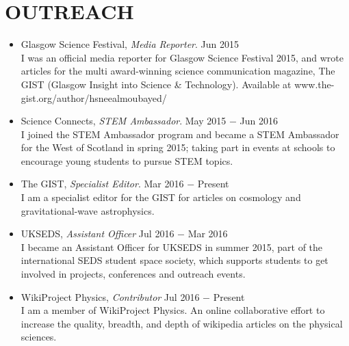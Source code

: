 
\section{\textbf{\color{RoyalBlue}OUTREACH}}
\begin{itemize}
\item Glasgow Science Festival, {\sl Media Reporter}. \hfill Jun 2015 \\
I was an official media reporter for Glasgow Science Festival 2015, and wrote articles for the multi award-winning science communication magazine, The GIST (Glasgow Insight into Science \& Technology). Available at www.the-gist.org/author/hsneealmoubayed/ \\

\item Science Connects, {\sl STEM Ambassador}. \hfill May 2015 $-$ Jun 2016 \\
I joined the STEM Ambassador program and became a STEM Ambassador for the West of Scotland in spring 2015; taking part in events at schools to encourage young students to pursue STEM topics. \\

\item The GIST, {\sl Specialist Editor}. \hfill Mar 2016 $-$ Present \\
I am a specialist editor for the GIST for articles on cosmology and gravitational-wave astrophysics. \\

\item UKSEDS, {\sl Assistant Officer} \hfill Jul 2016 $-$ Mar 2016\\
I became an Assistant Officer for UKSEDS in summer 2015, part of the international SEDS student space society, which supports students to get involved in projects, conferences and outreach events. \\

\item WikiProject Physics, {\sl Contributor} \hfill Jul 2016 $-$ Present\\
I am a member of WikiProject Physics. An online collaborative effort to increase the quality, breadth, and depth of wikipedia articles on the physical sciences. \\

\end{itemize}

